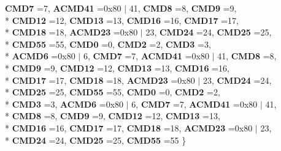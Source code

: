 \begin{DoxyCompactItemize}
{\bfseries C\-M\-D7} =7, 
{\bfseries A\-C\-M\-D41} =0x80 $\vert$ 41, 
{\bfseries C\-M\-D8} =8, 
{\bfseries C\-M\-D9} =9, 
\\*
{\bfseries C\-M\-D12} =12, 
{\bfseries C\-M\-D13} =13, 
{\bfseries C\-M\-D16} =16, 
{\bfseries C\-M\-D17} =17, 
\\*
{\bfseries C\-M\-D18} =18, 
{\bfseries A\-C\-M\-D23} =0x80 $\vert$ 23, 
{\bfseries C\-M\-D24} =24, 
{\bfseries C\-M\-D25} =25, 
\\*
{\bfseries C\-M\-D55} =55, 
{\bfseries C\-M\-D0} =0, 
{\bfseries C\-M\-D2} =2, 
{\bfseries C\-M\-D3} =3, 
\\*
{\bfseries A\-C\-M\-D6} =0x80 $\vert$ 6, 
{\bfseries C\-M\-D7} =7, 
{\bfseries A\-C\-M\-D41} =0x80 $\vert$ 41, 
{\bfseries C\-M\-D8} =8, 
\\*
{\bfseries C\-M\-D9} =9, 
{\bfseries C\-M\-D12} =12, 
{\bfseries C\-M\-D13} =13, 
{\bfseries C\-M\-D16} =16, 
\\*
{\bfseries C\-M\-D17} =17, 
{\bfseries C\-M\-D18} =18, 
{\bfseries A\-C\-M\-D23} =0x80 $\vert$ 23, 
{\bfseries C\-M\-D24} =24, 
\\*
{\bfseries C\-M\-D25} =25, 
{\bfseries C\-M\-D55} =55, 
{\bfseries C\-M\-D0} =0, 
{\bfseries C\-M\-D2} =2, 
\\*
{\bfseries C\-M\-D3} =3, 
{\bfseries A\-C\-M\-D6} =0x80 $\vert$ 6, 
{\bfseries C\-M\-D7} =7, 
{\bfseries A\-C\-M\-D41} =0x80 $\vert$ 41, 
\\*
{\bfseries C\-M\-D8} =8, 
{\bfseries C\-M\-D9} =9, 
{\bfseries C\-M\-D12} =12, 
{\bfseries C\-M\-D13} =13, 
\\*
{\bfseries C\-M\-D16} =16, 
{\bfseries C\-M\-D17} =17, 
{\bfseries C\-M\-D18} =18, 
{\bfseries A\-C\-M\-D23} =0x80 $\vert$ 23, 
\\*
{\bfseries C\-M\-D24} =24, 
{\bfseries C\-M\-D25} =25, 
{\bfseries C\-M\-D55} =55
 \}
\end{DoxyCompactItemize}
